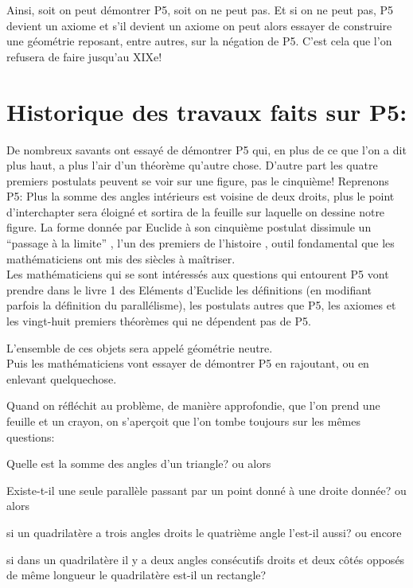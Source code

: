 \documentclass[a4paper, 12pt, twoside]{book}
\begin{document}
  Ainsi, soit on peut démontrer P5, soit on ne peut pas. Et si on ne peut pas, P5 devient un axiome et s'il devient un axiome on peut alors essayer de construire une géométrie reposant, entre autres, sur la négation de P5. C'est cela que l'on refusera de faire jusqu'au XIXe!
  
  \chapter{Historique des travaux faits sur P5:}\bigskip
  \bigskip
    De nombreux savants ont essayé de démontrer P5 qui, en plus de ce que l'on a dit plus haut, a plus l'air d'un théorème qu'autre chose. D'autre part les quatre premiers postulats peuvent se voir sur une figure, pas le cinquième!
       Reprenons P5:
   Plus la somme des angles intérieurs est voisine de deux droits, plus le point d'interchapter sera éloigné et sortira de la feuille sur laquelle on dessine notre figure.        
 La forme donnée par Euclide à son cinquième postulat dissimule un “passage à la limite” , l'un des premiers de l'histoire , outil fondamental que les mathématiciens ont mis des siècles à maîtriser.\\
 
 
  Les mathématiciens qui se sont intéressés aux questions qui entourent P5  vont prendre dans le livre 1 des Eléments d'Euclide les définitions (en modifiant parfois la définition du parallélisme), les postulats autres que P5, les axiomes et les vingt-huit premiers théorèmes qui ne dépendent pas de P5.\
  
  L'ensemble de ces objets sera appelé géométrie neutre.\\
  
    Puis  les mathématiciens vont essayer de démontrer P5 en rajoutant, ou en enlevant quelquechose.\
  
  Quand on réfléchit au problème, de manière approfondie, que l'on prend une feuille et un crayon, on s'aperçoit que l'on tombe toujours sur les mêmes questions: \
  
  Quelle est la somme  des angles d'un triangle? ou alors\
  
   Existe-t-il une seule parallèle passant par un point donné à une droite donnée? ou alors\
   
    si un quadrilatère a trois angles droits le quatrième angle l'est-il aussi? ou encore\
    
     si dans un quadrilatère il y a deux angles consécutifs droits et deux côtés opposés de même longueur le quadrilatère est-il un rectangle? \\
  
\end{document}
